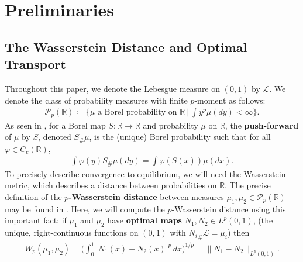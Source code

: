\documentclass[11pt]{article}
\newtheorem{defn}[thm]{Definition}
\numberwithin{equation}{section}
\begin{document}
\section{Preliminaries}
\subsection{The Wasserstein Distance and Optimal Transport}\label{OptimalTransport-section}
    Throughout this paper, we denote the Lebesgue measure on $(0,1)$ by $\mathcal{L}$. We denote the class of probability measures with finite $p$-moment as follows:
    \begin{align*}
        \mathcal{P}_p(\mathbb{R})\coloneq\big\{\mu \text{ a Borel probability on }\mathbb{R}\ \big|\ \int y^p\mu(dy)<\infty\big\}.
    \end{align*}
    As seen in \cite{Villani}, for a Borel map $S:\mathbb{R}\to\mathbb{R}$ and probability $\mu$ on $\mathbb{R}$, the \textbf{push-forward} of $\mu$ by $S$, denoted $S_\#\mu$, is the (unique) Borel probability such that for all $\varphi\in C_c(\mathbb{R})$,
    \begin{align*}
        \int\varphi(y)S_\#\mu(dy)=\int\varphi(S(x))\mu(dx). 
    \end{align*}
    To precisely describe convergence to equilibrium, we will need the Wasserstein metric, which describes a distance between probabilities on $\mathbb{R}$. The precise definition of the \textbf{$p$-Wasserstein distance} between measures $\mu_1,\mu_2\in\mathcal{P}_p(\mathbb{R})$ may be found in \cite{Villani}. 
    Here, we will compute the $p$-Wasserstein distance using this important fact: if $\mu_1$ and $\mu_2$ have \textbf{optimal maps} $N_1, N_2\in L^p(0,1)$, (the unique, right-continuous functions on $(0,1)$ with ${N_i}_\#\mathcal{L}=\mu_i$) then  
    \begin{align*}
        W_p(\mu_1, \mu_2)=\Big(\int_0^1 \big|N_1(x)-N_2(x)\big|^p \, dx\Big)^{1/p}=\|N_1-N_2\|_{L^p(0,1)}.
    \end{align*}
\end{document}
